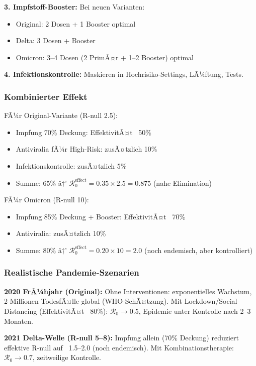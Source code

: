 ﻿\documentclass[a4paper,12pt,twoside]{article}
\theoremstyle{definition}
\begin{document}
\textbf{3. Impfstoff-Booster:} Bei neuen Varianten:
\begin{itemize}
\item Original: 2 Dosen + 1 Booster optimal
\item Delta: 3 Dosen + Booster
\item Omicron: 3--4 Dosen (2 PrimÃ¤r + 1--2 Booster) optimal
\end{itemize}

\textbf{4. Infektionskontrolle:} Maskieren in Hochrisiko-Settings, LÃ¼ftung, Tests.

\subsubsection{Kombinierter Effekt}

FÃ¼r Original-Variante (R-null 2.5):
\begin{itemize}
\item Impfung 70\% Deckung: EffektivitÃ¤t ~50\%
\item Antiviralia fÃ¼r High-Risk: zusÃ¤tzlich 10\%
\item Infektionskontrolle: zusÃ¤tzlich 5\%
\item Summe: 65\% â†’ $\mathcal{R}_0^{\text{effect}} = 0.35 \times 2.5 = 0.875$ (nahe Elimination)
\end{itemize}

FÃ¼r Omicron (R-null 10):
\begin{itemize}
\item Impfung 85\% Deckung + Booster: EffektivitÃ¤t ~70\%
\item Antiviralia: zusÃ¤tzlich 10\%
\item Summe: 80\% â†’ $\mathcal{R}_0^{\text{effect}} = 0.20 \times 10 = 2.0$ (noch endemisch, aber kontrolliert)
\end{itemize}

\subsubsection{Realistische Pandemie-Szenarien}

\textbf{2020 FrÃ¼hjahr (Original):} Ohne Interventionen: exponentielles Wachstum, 2 Millionen TodesfÃ¤lle global (WHO-SchÃ¤tzung). Mit Lockdown/Social Distancing (EffektivitÃ¤t ~80\%): $\mathcal{R}_0 \to 0.5$, Epidemie unter Kontrolle nach 2--3 Monaten.

\textbf{2021 Delta-Welle (R-null 5--8):} Impfung allein (70\% Deckung) reduziert effektive R-null auf ~1.5--2.0 (noch endemisch). Mit Kombinationstherapie: $\mathcal{R}_0 \to 0.7$, zeitweilige Kontrolle.
\end{document}
